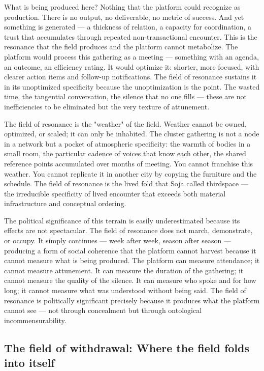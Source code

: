 What is being produced here? Nothing that the platform could recognize as production. There is no output, no deliverable, no metric of success. And yet something is generated — a thickness of relation, a capacity for coordination, a trust that accumulates through repeated non-transactional encounter. This is the resonance that the field produces and the platform cannot metabolize. The platform would process this gathering as a meeting — something with an agenda, an outcome, an efficiency rating. It would optimize it: shorter, more focused, with clearer action items and follow-up notifications. The field of resonance sustains it in its unoptimized specificity because the unoptimization is the point. The wasted time, the tangential conversation, the silence that no one fills — these are not inefficiencies to be eliminated but the very texture of attunement.

The field of resonance is the "weather" of the field. Weather cannot be owned, optimized, or scaled; it can only be inhabited. The cluster gathering is not a node in a network but a pocket of atmospheric specificity: the warmth of bodies in a small room, the particular cadence of voices that know each other, the shared reference points accumulated over months of meeting. You cannot franchise this weather. You cannot replicate it in another city by copying the furniture and the schedule. The field of resonance is the lived fold that Soja called thirdspace — the irreducible specificity of lived encounter that exceeds both material infrastructure and conceptual ordering.

The political significance of this terrain is easily underestimated because its effects are not spectacular. The field of resonance does not march, demonstrate, or occupy. It simply continues — week after week, season after season — producing a form of social coherence that the platform cannot harvest because it cannot measure what is being produced. The platform can measure attendance; it cannot measure attunement. It can measure the duration of the gathering; it cannot measure the quality of the silence. It can measure who spoke and for how long; it cannot measure what was understood without being said. The field of resonance is politically significant precisely because it produces what the platform cannot see — not through concealment but through ontological incommensurability.

\subsection{The field of withdrawal: Where the field folds into itself}

